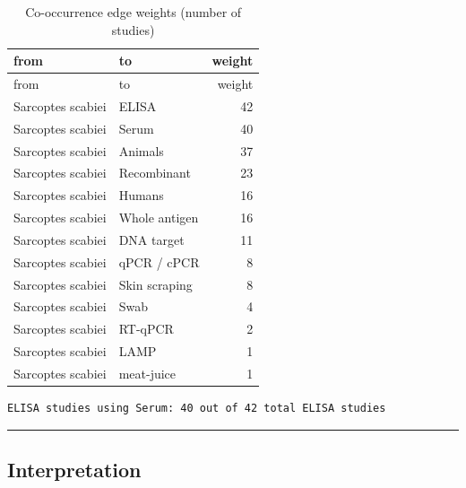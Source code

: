 \documentclass[
  letterpaper,
  DIV=11,
  numbers=noendperiod]{scrartcl}
\newenvironment{Shaded}{\begin{snugshade}}{\end{snugshade}}
\newcommand{\AttributeTok}[1]{\textcolor[rgb]{0.40,0.45,0.13}{#1}}
\newcommand{\ConstantTok}[1]{\textcolor[rgb]{0.56,0.35,0.01}{#1}}
\newcommand{\FunctionTok}[1]{\textcolor[rgb]{0.28,0.35,0.67}{#1}}
\newcommand{\NormalTok}[1]{\textcolor[rgb]{0.00,0.23,0.31}{#1}}
\newcommand{\SpecialCharTok}[1]{\textcolor[rgb]{0.37,0.37,0.37}{#1}}
\newcommand{\StringTok}[1]{\textcolor[rgb]{0.13,0.47,0.30}{#1}}
\begin{document}
\begin{longtable}[]{@{}llr@{}}
\caption{Co-occurrence edge weights (number of studies)}\tabularnewline
\toprule\noalign{}
from & to & weight \\
\midrule\noalign{}
\endfirsthead
\toprule\noalign{}
from & to & weight \\
\midrule\noalign{}
\endhead
\bottomrule\noalign{}
\endlastfoot
Sarcoptes scabiei & ELISA & 42 \\
Sarcoptes scabiei & Serum & 40 \\
Sarcoptes scabiei & Animals & 37 \\
Sarcoptes scabiei & Recombinant & 23 \\
Sarcoptes scabiei & Humans & 16 \\
Sarcoptes scabiei & Whole antigen & 16 \\
Sarcoptes scabiei & DNA target & 11 \\
Sarcoptes scabiei & qPCR / cPCR & 8 \\
Sarcoptes scabiei & Skin scraping & 8 \\
Sarcoptes scabiei & Swab & 4 \\
Sarcoptes scabiei & RT-qPCR & 2 \\
Sarcoptes scabiei & LAMP & 1 \\
Sarcoptes scabiei & meat-juice & 1 \\
\end{longtable}

\begin{Shaded}
\end{Shaded}

\begin{verbatim}
ELISA studies using Serum: 40 out of 42 total ELISA studies
\end{verbatim}

\begin{center}\rule{0.5\linewidth}{0.5pt}\end{center}

\subsection{Interpretation}\label{interpretation}
\end{document}
